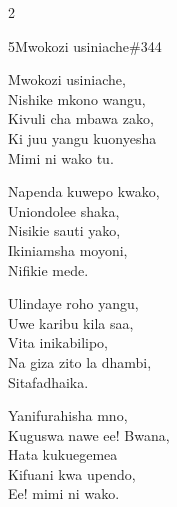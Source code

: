 \documentclass{article}
\begin{document}
\begin{multicols}{2}
\begin{hymn}{5}{Mwokozi usiniache}{\#344}
\begin{stanza}
Mwokozi usiniache,\\
Nishike mkono wangu,\\
Kivuli cha mbawa zako,\\
Ki juu yangu kuonyesha\\
Mimi ni wako tu.
\end{stanza}
\begin{stanza}
Napenda kuwepo kwako,\\
Uniondolee shaka,\\
Nisikie sauti yako,\\
Ikiniamsha moyoni,\\
Nifikie mede.
\end{stanza}
\begin{stanza}
Ulindaye roho yangu,\\
Uwe karibu kila saa,\\
Vita inikabilipo,\\
Na giza zito la dhambi,\\
Sitafadhaika.
\end{stanza}
\begin{stanza}
Yanifurahisha mno,\\
Kuguswa nawe ee! Bwana,\\
Hata kukuegemea\\
Kifuani kwa upendo,\\
Ee! mimi ni wako.
\end{stanza}
\end{hymn}


\end{multicols}
\end{document}
